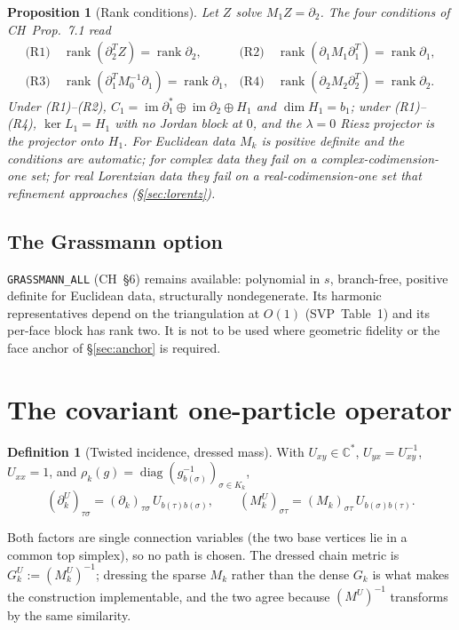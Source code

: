\documentclass[11pt]{article}
\theoremstyle{definition}
\newtheorem{definition}{Definition}[section]
\theoremstyle{plain}
\newtheorem{proposition}{Proposition}[section]
\theoremstyle{remark}
\newcommand{\C}{\mathbb{C}}
\newcommand{\rank}{\operatorname{rank}}
\newcommand{\im}{\operatorname{im}}
\newcommand{\diag}{\operatorname{diag}}
\newcommand{\bd}{\partial}
\newcommand{\Tr}{^{T}}
\newcommand{\ttt}[1]{\texttt{#1}}
\begin{document}
\begin{proposition}[Rank conditions]\label{prop:rank}
Let \(Z\) solve \(M_1Z=\bd_2\). The four conditions of CH~Prop.~7.1 read
\begin{align*}
\text{(R1)}\ &\rank(\bd_2\Tr Z)=\rank\bd_2, &
\text{(R2)}\ &\rank(\bd_1M_1\bd_1\Tr)=\rank\bd_1,\\
\text{(R3)}\ &\rank(\bd_1\Tr M_0^{-1}\bd_1)=\rank\bd_1, &
\text{(R4)}\ &\rank(\bd_2M_2\bd_2\Tr)=\rank\bd_2 .
\end{align*}
Under (R1)--(R2), \(C_1=\im\bd_1^{*}\oplus\im\bd_2\oplus H_1\) and \(\dim H_1=b_1\); under (R1)--(R4), \(\ker L_1=H_1\) with no Jordan block at \(0\), and the \(\lambda=0\) Riesz projector is the projector onto \(H_1\). For Euclidean data \(M_k\) is positive definite and the conditions are automatic; for complex data they fail on a complex-codimension-one set; for real Lorentzian data they fail on a real-codimension-one set that refinement approaches (\S\ref{sec:lorentz}).
\end{proposition}

\subsection{The Grassmann option}
\ttt{GRASSMANN\_ALL} (CH~\S6) remains available: polynomial in \(s\), branch-free, positive definite for Euclidean data, structurally nondegenerate. Its harmonic representatives depend on the triangulation at \(O(1)\) (SVP~Table~1) and its per-face block has rank two. It is not to be used where geometric fidelity or the face anchor of \S\ref{sec:anchor} is required.

\section{The covariant one-particle operator}\label{sec:h1}

\begin{definition}[Twisted incidence, dressed mass]\label{def:twist}
With \(U_{xy}\in\C^{*}\), \(U_{yx}=U_{xy}^{-1}\), \(U_{xx}=1\), and \(\rho_k(g)=\diag(g_{b(\sigma)}^{-1})_{\sigma\in K_k}\),
\[
(\bd_k^{U})_{\tau\sigma}=(\bd_k)_{\tau\sigma}\,U_{b(\tau)b(\sigma)},\qquad
(M_k^{U})_{\sigma\tau}=(M_k)_{\sigma\tau}\,U_{b(\sigma)b(\tau)} .
\]
\end{definition}
Both factors are single connection variables (the two base vertices lie in a common top simplex), so no path is chosen. The dressed chain metric is \(G_k^{U}:=(M_k^{U})^{-1}\); dressing the sparse \(M_k\) rather than the dense \(G_k\) is what makes the construction implementable, and the two agree because \((M^{U})^{-1}\) transforms by the same similarity.
\end{document}
